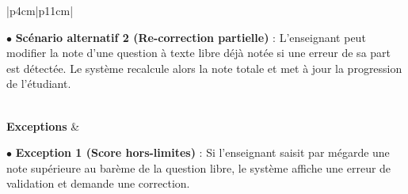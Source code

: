 \documentclass[12pt,a4paper]{report}
\begin{document}
\begin{table}[H]
\begin{tabular}{|p{4cm}|p{11cm}|}
\begin{minipage}[t]{\linewidth}
$\bullet$ \textbf{Scénario alternatif 2 (Re-correction partielle)} : L'enseignant peut modifier la note d'une question à texte libre déjà notée si une erreur de sa part est détectée. Le système recalcule alors la note totale et met à jour la progression de l'étudiant.
\vspace{0.1cm}
\end{minipage} \\
\hline
\textbf{Exceptions} & 
\begin{minipage}[t]{\linewidth}
$\bullet$ \textbf{Exception 1 (Score hors-limites)} : Si l'enseignant saisit par mégarde une note supérieure au barème de la question libre, le système affiche une erreur de validation et demande une correction.
\vspace{0.1cm}
\end{minipage} \\
\hline
\end{tabular}
\end{table}
\end{document}
